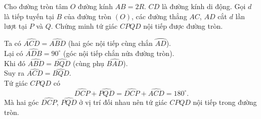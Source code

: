 \begin{bt}%
 Cho đường tròn tâm $O$ đường kính $AB = 2R$. $CD$ là đường kính di động. Gọi $d$ là tiếp tuyến tại $B$ của đường tròn $(O)$, các đường thẳng $AC$, $AD$ cắt $d$ lần lượt tại $P$ và $Q$. Chứng minh tứ giác $CPQD$ nội tiếp được đường tròn.
 \loigiai
  {
  \immini
  {
  Ta có $\widehat{ACD}=\widehat{ABD}$ (hai góc nội tiếp cùng chắn $\wideparen{AD}$).\\
  Lại có $\widehat{ADB}=90^\circ$ (góc nội tiếp chắn nửa đường tròn).\\
  Khi đó $\widehat{ABD}=\widehat{BQD}$ (cùng phụ $\widehat{BAD}$).\\
  Suy ra $\widehat{ACD}=\widehat{BQD}$.\\
  Tứ giác $CPQD$ có
  $$\widehat{DCP}+\widehat{PQD} = \widehat{DCP}+\widehat{ACD} = 180^\circ.$$
  Mà hai góc $\widehat{DCP}$, $\widehat{PQD}$ ở vị trí đối nhau nên tứ giác $CPQD$ nội tiếp trong đường tròn.
  }
  {
  }
  }
\end{bt}

